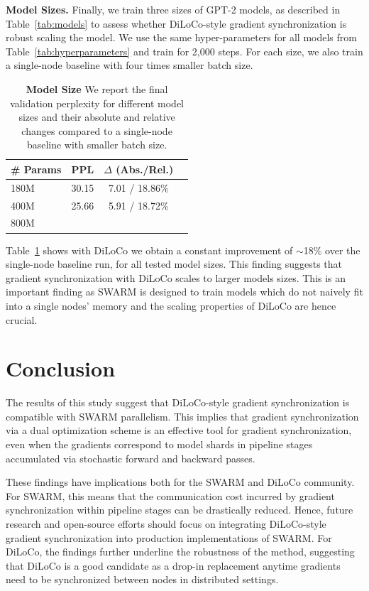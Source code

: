 \documentclass{article}
\begin{document}
\textbf{Model Sizes.} Finally, we train three sizes of GPT-2 models, as 
described in Table~\ref{tab:models} to assess whether DiLoCo-style gradient
synchronization is robust scaling the model. We use the same hyper-parameters
for all models from Table~\ref{tab:hyperparameters} and train for 2,000 steps.
For each size, we also train a single-node baseline with four times smaller
batch size.

\begin{table}[ht]
\centering
\begin{tabular}{lccc}
\toprule
\textbf{\# Params} & \textbf{PPL} & \textbf{$\Delta$ (Abs./Rel.)} \\ 
\midrule
180M & 30.15 & 7.01 / 18.86\% \\
400M & 25.66 & 5.91 / 18.72\% \\
800M & & & \\
\bottomrule
\end{tabular}
\caption{\textbf{Model Size} We report the final validation perplexity for
different model sizes and their absolute and relative changes compared to a
single-node baseline with smaller batch size.}
\label{tab:experiment3}
\end{table}

Table~\ref{tab:experiment3} shows with DiLoCo we obtain a constant improvement
of $\sim$18\% over the single-node baseline run, for all tested model sizes.
This finding suggests that gradient synchronization with DiLoCo scales to larger
models sizes. This is an important finding as SWARM is designed to train models
which do not naively fit into a single nodes' memory and the scaling properties
of DiLoCo are hence crucial.

\section{Conclusion}

The results of this study suggest that DiLoCo-style gradient synchronization is
compatible with SWARM parallelism. This implies that gradient 
synchronization via a dual optimization scheme is an effective tool for gradient
synchronization, even when the gradients correspond to model shards in pipeline
stages accumulated via stochastic forward and backward passes.

These findings have implications both for the SWARM and DiLoCo community. For
SWARM, this means that the communication cost incurred by gradient
synchronization within pipeline stages can be drastically reduced. Hence, future
research and open-source efforts should focus on integrating DiLoCo-style 
gradient synchronization into production implementations of SWARM. For DiLoCo,
the findings further underline the robustness of the method, suggesting that
DiLoCo is a good candidate as a drop-in replacement anytime gradients need to be
synchronized between nodes in distributed settings.
\end{document}
